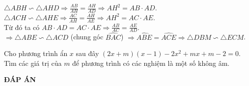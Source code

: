 \begin{ex}
{\begin{enumerate}[a)]
		$\triangle ABH \backsim \triangle AHD \Rightarrow \displaystyle\frac{AB}{AH}=\displaystyle\frac{AH}{AD} \Rightarrow AH^2=AB\cdot AD$.\\
		$\triangle ACH \backsim \triangle AHE \Rightarrow \displaystyle\frac{AC}{AH}=\displaystyle\frac{AH}{AE} \Rightarrow AH^2=AC\cdot AE$.\\
		Từ đó ta có $AB\cdot AD = AC \cdot AE \Rightarrow \displaystyle\frac{AB}{AC}=\displaystyle\frac{AE}{AD}$.\\
		$\Rightarrow \triangle ABE \backsim \triangle ACD$ (chung góc $\widehat{BAC}$) $\Rightarrow \widehat{ABE}=\widehat{ACE} \Rightarrow \triangle DBM \backsim \triangle ECM$.
	\end{enumerate}
	}
\end{ex}
\begin{ex}%
	Cho phương trình ẩn $x$ sau đây $(2x+m)(x-1)-2x^2+mx+m-2=0$. Tìm các giá trị của $m$ để phương trình có các nghiệm là một số không âm.
\end{ex}

\newpage
\begin{center}
	\textbf{ĐÁP ÁN}
\end{center}
\begin{multicols}{10}
	 
\end{multicols}